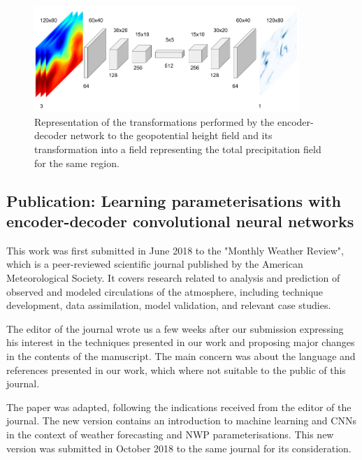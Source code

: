 \medskip

\begin{figure}[h]
 \centerline{\includegraphics[width=10cm]{paper4.png}}\caption{Representation of the transformations performed by the encoder-decoder network to the geopotential height field and its transformation into a field representing the total precipitation field for the same region.}\label{paper4}
\end{figure}

\subsection{Publication: Learning parameterisations with encoder-decoder convolutional neural networks}

This work was first submitted in June 2018 to the "Monthly Weather Review", which is a peer-reviewed scientific journal published by the American Meteorological Society. It covers research related to analysis and prediction of observed and modeled circulations of the atmosphere, including technique development, data assimilation, model validation, and relevant case studies.

\medskip

The editor of the journal wrote us a few weeks after our submission expressing his interest in the techniques presented in our work and proposing major changes in the contents of the manuscript. The main concern was about the language and references presented in our work, which where not suitable to the public of this journal. 

\medskip

The paper was adapted, following the indications received from the editor of the journal. The new version contains an introduction to machine learning and CNNs in the context of weather forecasting and NWP parameterisations. This new version was submitted in October 2018 to the same journal for its consideration.


